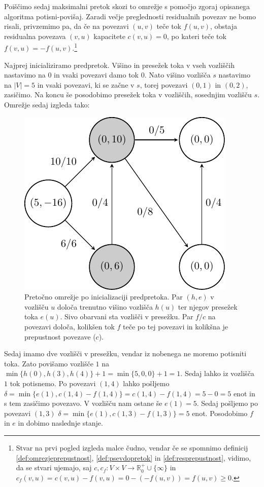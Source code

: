\documentclass[mat1]{fmfdelo}
\newcommand{\R}{\mathbb R}
\begin{document}
Poiščimo sedaj maksimalni pretok skozi to omrežje s pomočjo zgoraj opisanega algoritma potisni-povišaj.
Zaradi večje preglednosti residualnih povezav ne bomo risali, privzemimo pa, da če na povezavi $(u,v)$ teče tok $f(u,v)$,
obstaja residualna povezava $(v,u)$ kapacitete $c(v,u) = 0$, po kateri teče tok $f(v,u) = -f(u,v)$.\footnote{Stvar na prvi
pogled izgleda malce čudno, vendar če se spomnimo definicij \ref{def:omrezjeprepustnost}, \ref{def:psevdopretok} in \ref{def:resprepustnost}, vidimo,
da se stvari ujemajo, saj $c, c_f \colon V \times V \rightarrow \R^+_0 \cup \{\infty\}$ in $c_f(v,u) = c(v,u) - f(v,u) = 0 - (-f(u,v)) = f(u,v) \geq 0$.}

Najprej inicializiramo predpretok. Višino in presežek toka v vseh vozliščih nastavimo na $0$ in vsaki povezavi
damo tok $0$. Nato višino vozlišča $s$ nastavimo na $|V| = 5$ in vsaki povezavi, ki se začne v $s$, torej
povezavi $(0,1)$ in $(0,2)$, zasičimo. Na koncu še posodobimo presežek toka v vozliščih, sosednjim vozlišču $s$.
Omrežje sedaj izgleda tako:

\begin{figure}[H]
  \centering
  \includegraphics{images/graf2-2.pdf}
  \caption{Pretočno omrežje po inicializaciji predpretoka. Par $(h, e)$ v vozlišču $u$ določa trenutno višino vozlišča $h(u)$ ter njegov presežek toka $e(u)$. Sivo obarvani sta vozlišči v presežku. Par $f/c$ na povezavi določa, kolikšen tok $f$ teče po tej povezavi in kolikšna je prepustnost povezave ($c$).}
\end{figure}

Sedaj imamo dve vozlišči v presežku, vendar iz nobenega ne moremo potisniti toka. Zato povišamo vozlišče $1$ na $\min \{h(0), h(3), h(4)\} + 1 = \min \{5, 0, 0\} + 1 = 1$. Sedaj lahko iz vozlišča $1$ tok potisnemo.
Po povezavi $(1,4)$ lahko pošljemo $\delta = \min\{e(1), c(1,4) - f(1,4)\} = c(1,4) - f(1,4) = 5 - 0 = 5$ enot in s tem zasičimo povezavo. V vozlišču nam ostane še $e(1) = 5$. Sedaj pošljemo po povezavi
$(1,3)$ $\delta = \min \{e(1), c(1,3) - f(1,3)\} = 5$ enot. Posodobimo $f$ in $e$ in dobimo naslednje stanje.
\end{document}
